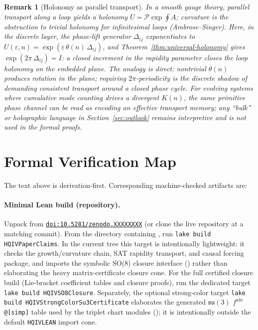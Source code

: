 \documentclass[11pt]{amsart}
\newtheorem{remark}[theorem]{Remark}
\newcommand{\PaperZenodoDoi}{10.5281/zenodo.XXXXXXXX}
\newcommand{\PaperArtifactBundleZip}{\path{paper_refs_bundle_2026-05-06.zip}}
\newcommand{\PaperZenodoDeposit}{\href{https://doi.org/\PaperZenodoDoi}{\texttt{doi:\PaperZenodoDoi}}}
\begin{document}
\begin{remark}[Holonomy as parallel transport]
In a smooth gauge theory, parallel transport along a loop yields a holonomy \(U=\mathcal P\exp\oint A\); curvature is the obstruction to trivial holonomy for infinitesimal loops (Ambrose--Singer). Here, in the discrete layer, the phase-lift generator \(\Delta_{ij}\) exponentiates to \(U(\varepsilon,n)=\exp(\varepsilon\,\theta(n)\,\Delta_{ij})\), and Theorem~\ref{thm:universal-holonomy} gives \(\exp(2\pi\,\Delta_{ij})=I\): a \emph{closed} increment in the rapidity parameter closes the loop holonomy on the embedded plane. The analogy is direct: nontrivial \(\theta(n)\) produces rotation in the plane; requiring \(2\pi\)-periodicity is the discrete shadow of demanding consistent transport around a closed phase cycle. For evolving systems where cumulative mode counting drives a divergent \(K(n)\), the same primitive phase channel can be read as encoding an effective transport memory; any ``bulk'' or holographic language in Section~\ref{sec:outlook} remains interpretive and is not used in the formal proofs.
\end{remark}

\appendix
\section{Formal Verification Map}

The text above is derivation-first. Corresponding machine-checked artifacts are:

\paragraph{Minimal Lean build (repository).}
Unpack \PaperArtifactBundleZip{} from \PaperZenodoDeposit{} (or clone the live \cite{hqiv-lean} repository at a matching commit). From the directory containing , run \texttt{lake build HQIVPaperClaims}. In the current tree this target is intentionally lightweight: it checks the growth/curvature chain, SAT rapidity transport, and causal forcing package, and imports the symbolic SO(8) closure interface () rather than elaborating the heavy matrix-certificate closure cone.
For the full certified closure build (Lie-bracket coefficient tables and closure proofs), run the dedicated target \texttt{lake build HQIVSO8Closure}.
Separately, the optional strong-color target \texttt{lake build HQIVStrongColorSu3Certificate} elaborates the generated \(\mathfrak{su}(3)\) \(f^{abc}\) \texttt{@[simp]} table used by the triplet chart modules (); it is intentionally outside the default \texttt{HQIVLEAN} import cone.
\end{document}
